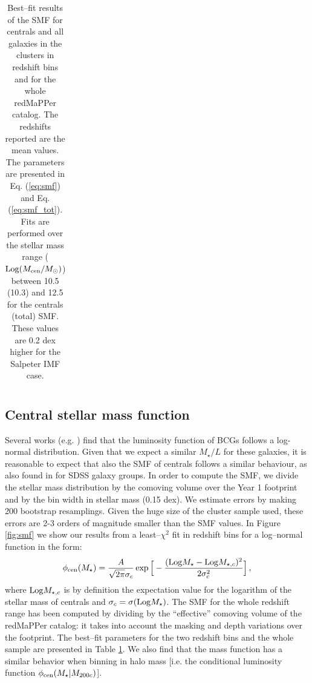 {\begin{table}
\begin{tabular}{c|cccc}
\end{tabular}

\caption{Best--fit results of the SMF for centrals and all galaxies in the clusters in redshift bins and for the whole redMaPPer catalog. The redshifts reported are the mean values. The parameters are presented in Eq. (\ref{eq:smf}) and Eq.(\ref{eq:smf_tot}). Fits are performed over the stellar mass range (${\rm Log}(M_{\rm cen}/M_\odot)$) between 10.5 (10.3) and 12.5 for the centrals (total) SMF. These values are 0.2 dex higher for the Salpeter IMF case. }\label{tab:smf}
\end{table}


\subsection{Central stellar mass function}

Several works (e.g. \citealt{lauer}) find that the luminosity function of BCGs follows a log-normal distribution. Given that we expect a similar $M_\star/L$ for these galaxies, it is reasonable to expect that also the SMF of centrals follows a similar behaviour, as also found in \citet{yang} for SDSS galaxy groups. In order to compute the SMF, we divide the stellar mass distribution by the comoving volume over the Year 1 footprint and by the bin width in stellar mass (0.15 dex). We estimate errors by making 200 bootstrap resamplings. Given the huge size of the cluster sample used, these errors are 2-3 orders of magnitude smaller than the SMF values. In Figure \ref{fig:smf} we show our results from a least--$\chi^2$ fit in redshift bins for a log--normal function in the form:
\begin{equation}
\phi_{\rm cen} (M_\star)=\frac{A}{\sqrt{2\pi}\sigma_c}\exp{\Big[ -\frac{({\rm Log} M_\star-{\rm Log} M_{\star,c})^2}{2\sigma_c^2} \Big]}\,,\label{eq:smf}
\end{equation}
where ${\rm Log}M_{\star,c}$ is by definition the expectation value for the logarithm of the stellar mass of centrals and $\sigma_c = \sigma({\rm Log}M_\star)$. The SMF for the whole redshift range has been computed by dividing by the ``effective'' comoving volume of the redMaPPer catalog: it takes into account the masking and depth variations over the footprint. The best--fit parameters for the two redshift bins and the whole sample are presented in Table \ref{tab:smf}. We also find that the mass function has a similar behavior when binning in halo mass [i.e. the conditional luminosity function $\phi_{\rm cen} (M_\star|M_{200c})$]. 

}
